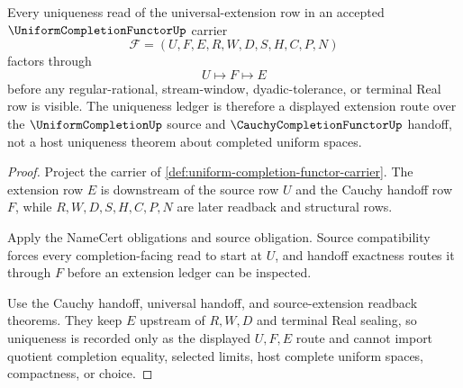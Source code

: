 \begin{theorem}
\label{thm:uniformcompletionfunctor-universal-extension-uniqueness-ledger}
Every uniqueness read of the universal-extension row in an accepted $\UniformCompletionFunctorUp$ carrier
$$
\mathcal{F}=(U,F,E,R,W,D,S,H,C,P,N)
$$
factors through
$$
U \longmapsto F \longmapsto E
$$
before any regular-rational, stream-window, dyadic-tolerance, or terminal Real row is visible. The uniqueness ledger is therefore a displayed extension route over the $\UniformCompletionUp$ source and $\CauchyCompletionFunctorUp$ handoff, not a host uniqueness theorem about completed uniform spaces.
\end{theorem}
\begin{proof}
Project the carrier of \autoref{def:uniform-completion-functor-carrier}. The extension row $E$ is downstream of the source row $U$ and the Cauchy handoff row $F$, while $R,W,D,S,H,C,P,N$ are later readback and structural rows.

Apply the NameCert obligations and source obligation. Source compatibility forces every completion-facing read to start at $U$, and handoff exactness routes it through $F$ before an extension ledger can be inspected.

Use the Cauchy handoff, universal handoff, and source-extension readback theorems. They keep $E$ upstream of $R,W,D$ and terminal Real sealing, so uniqueness is recorded only as the displayed $U,F,E$ route and cannot import quotient completion equality, selected limits, host complete uniform spaces, compactness, or choice.
\end{proof}

